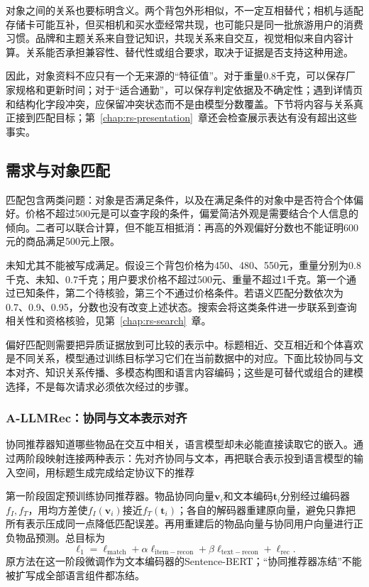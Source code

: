 对象之间的关系也要标明含义。两个背包外形相似，不一定互相替代；相机与适配存储卡可能互补，但买相机和买水壶经常共现，也可能只是同一批旅游用户的消费习惯。品牌和主题关系来自登记知识，共现关系来自交互，视觉相似来自内容计算。关系能否承担兼容性、替代性或组合要求，取决于证据是否支持这种用途。

因此，对象资料不应只有一个无来源的“特征值”。对于重量0.8千克，可以保存厂家规格和更新时间；对于“适合通勤”，可以保存判定依据及不确定性；遇到详情页和结构化字段冲突，应保留冲突状态而不是由模型分数覆盖。下节将内容与关系真正接到匹配目标；第~\ref{chap:rs-presentation}~章还会检查展示表达有没有超出这些事实。

\subsection{需求与对象匹配}
\label{sec:rs-user-item-match}

匹配包含两类问题：对象是否满足条件，以及在满足条件的对象中是否符合个体偏好。价格不超过500元是可以查字段的条件，偏爱简洁外观是需要结合个人信息的倾向。二者可以联合计算，但不能互相抵消：再高的外观偏好分数也不能证明600元的商品满足500元上限。

未知尤其不能被写成满足。假设三个背包价格为450、480、550元，重量分别为0.8千克、未知、0.7千克；用户要求价格不超过500元、重量不超过1千克。第一个通过已知条件，第二个待核验，第三个不通过价格条件。若语义匹配分数依次为0.7、0.9、0.95，分数也没有改变上述状态。搜索会将这类条件进一步联系到查询相关性和资格核验，见第~\ref{chap:rs-search}~章。

偏好匹配则需要把异质证据放到可比较的表示中。标题相近、交互相近和个体喜欢是不同关系，模型通过训练目标学习它们在当前数据中的对应。下面比较协同与文本对齐、知识关系传播、多模态构图和语言内容编码；这些是可替代或组合的建模选择，不是每次请求必须依次经过的步骤。

\subsubsection{A-LLMRec：协同与文本表示对齐}
\label{sec:rs-a-llmrec}

协同推荐器知道哪些物品在交互中相关，语言模型却未必能直接读取它的嵌入。通过两阶段映射连接两种表示：先对齐协同与文本，再把联合表示投到语言模型的输入空间，用标题生成完成给定协议下的推荐

第一阶段固定预训练协同推荐器。物品协同向量$\bm{v}_i$和文本编码$\bm{t}_i$分别经过编码器$f_I,f_T$，用均方差使$f_I(\bm{v}_i)$接近$f_T(\bm{t}_i)$；各自的解码器重建原向量，避免只靠把所有表示压成同一点降低匹配误差。再用重建后的物品向量与协同用户向量进行正负物品预测。总目标为
\begin{equation}
  \ell_1=\ell_{\mathrm{match}}
      +\alpha\ell_{\mathrm{item-recon}}
      +\beta\ell_{\mathrm{text-recon}}+\ell_{\mathrm{rec}}.
  \label{eq:rs-a-llmrec-stage1}
\end{equation}
原方法在这一阶段微调作为文本编码器的Sentence-BERT；“协同推荐器冻结”不能被扩写成全部语言组件都冻结。

